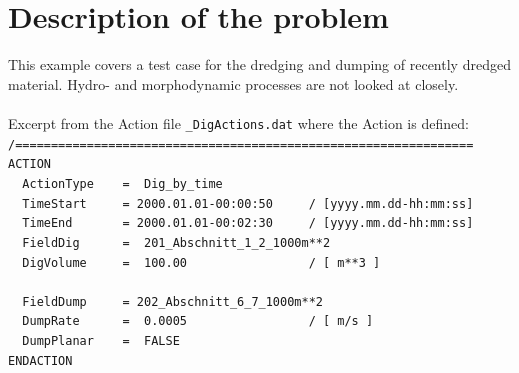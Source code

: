 \section{Description of the problem}
%
This example covers a test case for the dredging and dumping of recently dredged material.
Hydro- and morphodynamic processes are not looked at closely.\\
\\
Excerpt from the Action file \texttt{\_DigActions.dat} where the Action is defined:\\
\hspace*{3mm} \texttt{\small{/================================================================}}\\
\hspace*{3mm} \texttt{\small{ACTION}}                                                           \\
\hspace*{3mm} \texttt{\small{~~ActionType~~~~=~~Dig\_by\_time}}                                 \\
\hspace*{3mm} \texttt{\small{~~TimeStart~~~~~=~2000.01.01-00:00:50~~~~~/~[yyyy.mm.dd-hh:mm:ss]}}\\
\hspace*{3mm} \texttt{\small{~~TimeEnd~~~~~~~=~2000.01.01-00:02:30~~~~~/~[yyyy.mm.dd-hh:mm:ss]}}\\
\hspace*{3mm} \texttt{\small{~~FieldDig~~~~~~=~~201\_Abschnitt\_1\_2\_1000m**2}}                \\
\hspace*{3mm} \texttt{\small{~~DigVolume~~~~~=~~100.00~~~~~~~~~~~~~~~~~/~[~m**3~]}}             \\
                                                                                                \\
\hspace*{3mm} \texttt{\small{~~FieldDump~~~~~=~202\_Abschnitt\_6\_7\_1000m**2}}                 \\
\hspace*{3mm} \texttt{\small{~~DumpRate~~~~~~=~~0.0005~~~~~~~~~~~~~~~~~/~[~m/s~]}}              \\
\hspace*{3mm} \texttt{\small{~~DumpPlanar~~~~=~~FALSE}}                                         \\
\hspace*{3mm} \texttt{\small{ENDACTION}}                                                        \\
